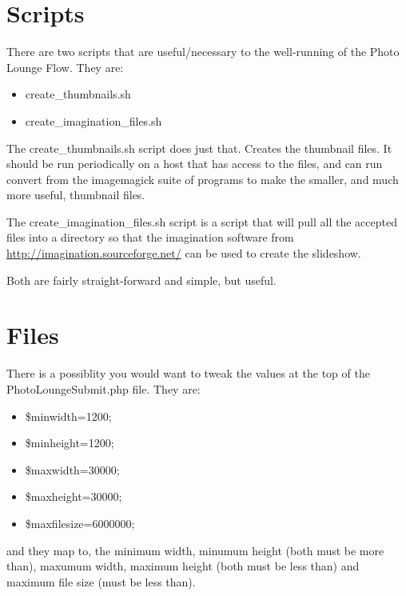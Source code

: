 \documentclass[captions=tablesignature]{scrartcl}
\begin{document}
\section{Scripts}
\label{sec-3}

There are two scripts that are useful/necessary to the well-running
of the Photo Lounge Flow.  They are:
\begin{itemize}
\item create\_thumbnails.sh
\item create\_imagination\_files.sh
\end{itemize}

The create\_thumbnails.sh script does just that.  Creates the
thumbnail files.  It should be run periodically on a host that has
access to the files, and can run convert from the imagemagick suite
of programs to make the smaller, and much more useful, thumbnail
files.

The create\_imagination\_files.sh script is a script that will pull
all the accepted files into a directory so that the imagination
software from \url{http://imagination.sourceforge.net/} can be used to
create the slideshow.

Both are fairly straight-forward and simple, but useful.

\section{Files}
\label{sec-4}
There is a possiblity you would want to tweak the values at the top
of the PhotoLoungeSubmit.php file.  They are:
\begin{itemize}
\item \$minwidth=1200;
\item \$minheight=1200;
\item \$maxwidth=30000;
\item \$maxheight=30000;
\item \$maxfilesize=6000000;
\end{itemize}

and they map to, the minimum width, minumum height (both must
be more than), maxumum width, maximum height (both must be less
than) and maximum file size (must be less than).
\end{document}
